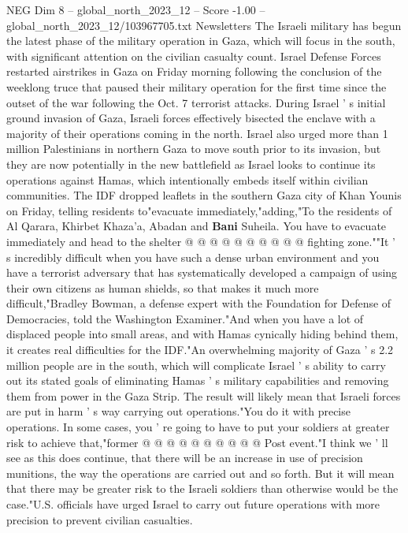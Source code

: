 \begin{textsample}{NEG Dim 8 – global\_north\_2023\_12 – Score -1.00 – global\_north\_2023\_12/103967705.txt}  \label{ex:f8_neg_341}
Newsletters The Israeli military has begun the latest phase of the military operation in Gaza, which will focus in the south, with significant attention on the civilian casualty count.
Israel Defense Forces restarted airstrikes in Gaza on Friday morning following the conclusion of the weeklong truce that paused their military operation for the first time since the outset of the war following the Oct. 7 terrorist attacks.
During Israel ' s initial ground invasion of Gaza, Israeli forces effectively bisected the enclave with a majority of their operations coming in the north.
Israel also urged more than 1 million Palestinians in northern Gaza to move south prior to its invasion, but they are now potentially in the new battlefield as Israel looks to continue its operations against Hamas, which intentionally embeds itself within civilian communities.
The IDF dropped leaflets in the southern Gaza city of Khan Younis on Friday, telling residents to"evacuate immediately,"adding,"To the residents of Al Qarara, Khirbet Khaza'a, Abadan and \textbf{Bani} Suheila.
You have to evacuate immediately and head to the shelter @ @ @ @ @ @ @ @ @ @ fighting zone.""It ' s incredibly difficult when you have such a dense urban environment and you have a terrorist adversary that has systematically developed a campaign of using their own citizens as human shields, so that makes it much more difficult,"Bradley Bowman, a defense expert with the Foundation for Defense of Democracies, told the Washington Examiner."And when you have a lot of displaced people into small areas, and with Hamas cynically hiding behind them, it creates real difficulties for the IDF."An overwhelming majority of Gaza ' s 2.2 million people are in the south, which will complicate Israel ' s ability to carry out its stated goals of eliminating Hamas ' s military capabilities and removing them from power in the Gaza Strip.
The result will likely mean that Israeli forces are put in harm ' s way carrying out operations."You do it with precise operations.
In some cases, you ' re going to have to put your soldiers at greater risk to achieve that,"former @ @ @ @ @ @ @ @ @ @ Post event."I think we ' ll see as this does continue, that there will be an increase in use of precision munitions, the way the operations are carried out and so forth.
But it will mean that there may be greater risk to the Israeli soldiers than otherwise would be the case."U.S. officials have urged Israel to carry out future operations with more precision to prevent civilian casualties.

\end{textsample}
